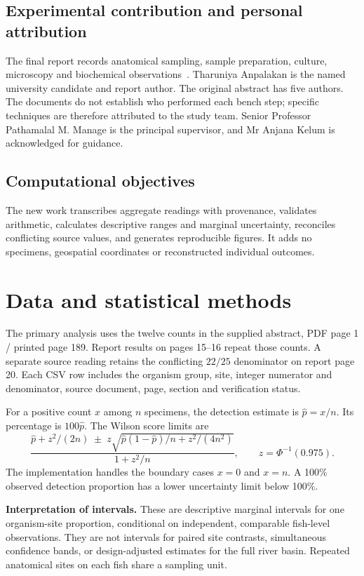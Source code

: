 \documentclass[11pt,a4paper]{article}
\newcommand{\sectiontitle}[1]{\section{\color{ink}#1}}
\begin{document}
\subsection*{Experimental contribution and personal attribution}
The final report records anatomical sampling, sample preparation, culture, microscopy and biochemical observations~\cite{report}. Tharuniya Anpalakan is the named university candidate and report author. The original abstract has five authors. The documents do not establish who performed each bench step; specific techniques are therefore attributed to the study team. Senior Professor Pathamalal M. Manage is the principal supervisor, and Mr Anjana Kelum is acknowledged for guidance.

\subsection*{Computational objectives}
The new work transcribes aggregate readings with provenance, validates arithmetic, calculates descriptive ranges and marginal uncertainty, reconciles conflicting source values, and generates reproducible figures. It adds no specimens, geospatial coordinates or reconstructed individual outcomes.

\clearpage
\sectiontitle{Data and statistical methods}
The primary analysis uses the twelve counts in the supplied abstract, PDF page 1 / printed page 189. Report results on pages 15--16 repeat those counts. A separate source reading retains the conflicting \(22/25\) denominator on report page 20. Each CSV row includes the organism group, site, integer numerator and denominator, source document, page, section and verification status.

For a positive count \(x\) among \(n\) specimens, the detection estimate is \(\widehat p=x/n\). Its percentage is \(100\widehat p\). The Wilson score limits are
\begin{equation}
\frac{\widehat p+z^2/(2n)\;\pm\;z\sqrt{\widehat p(1-\widehat p)/n+z^2/(4n^2)}}{1+z^2/n},
\qquad z=\Phi^{-1}(0.975).
\end{equation}
The implementation handles the boundary cases \(x=0\) and \(x=n\). A 100\% observed detection proportion has a lower uncertainty limit below 100\%.

\textbf{Interpretation of intervals.} These are descriptive marginal intervals for one organism-site proportion, conditional on independent, comparable fish-level observations. They are not intervals for paired site contrasts, simultaneous confidence bands, or design-adjusted estimates for the full river basin. Repeated anatomical sites on each fish share a sampling unit.
\end{document}
